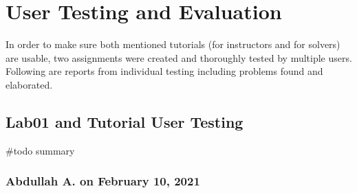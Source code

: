 \chapter{User Testing and Evaluation} \label{apx:usertest}

{In order to make sure both mentioned tutorials (for instructors and for solvers) are usable, two assignments were created and thoroughly tested by multiple users. Following are reports from individual testing including problems found and elaborated.}

\section{Lab01 and Tutorial User Testing}\label{sec:lab01}

{\#todo summary}

\subsection{Abdullah A. on February 10, 2021}\label{ssec:abdullah0210}

